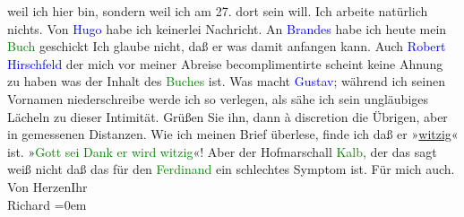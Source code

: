                weil ich hier bin, sondern weil ich am 27. dort sein will.\pend
           \pstart
           Ich arbeite natürlich nichts. Von \textcolor{blue}{Hugo}{}\ledrightnote{\textcolor{blue}{Hugo von Hofmannsthal}} habe ich
               keinerlei Nachricht. An \textcolor{blue}{Brandes}{}\ledrightnote{\textcolor{blue}{Georg Brandes}} habe ich heute
               mein \textcolor{green}{Buch}{} geschickt Ich glaube nicht, daß er was damit anfangen kann. Auch \textcolor{blue}{Robert Hirschfeld}{}\ledrightnote{\textcolor{blue}{Robert Hirschfeld}} der mich vor meiner Abreise
               becomplimentirte scheint keine Ahnung zu haben was der Inhalt des \textcolor{green}{Buches}{} ist. Was macht \textcolor{blue}{Gustav}{}\ledrightnote{\textcolor{blue}{Gustav Schwarzkopf}}; während ich seinen Vornamen niederschreibe werde ich so
               verlegen, als sähe ich sein ungläubiges Lächeln zu dieser Intimität. Grüßen Sie ihn,
               dann à discretion die Übrigen, aber in gemessenen Distanzen.\pend
           \pstart
           Wie ich meinen Brief überlese, finde ich daß er »\uline{witzig}« ist. »\textcolor{green}{Gott sei Dank er wird witzig}{}«! Aber der
               Hofmarschall \textcolor{green}{Kalb}{}, der das sagt
               weiß nicht daß das für den \textcolor{green}{Ferdinand}{} ein schlechtes Symptom ist. Für mich auch.\pend
           \pstart
           Von Herzen\hspace*{1.5em}Ihr{\\[\baselineskip]}\spacefill\mbox{Richard}\pend
           \leftskip=0em{}\endnumbering{}  
      